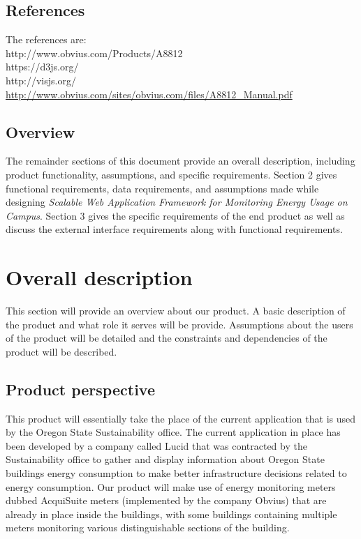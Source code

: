 \documentclass[onecolumn, draftclsnofoot,10pt, compsoc]{IEEEtran}
\begin{document}
    \subsection{References} 
	The references are:\\
	http://www.obvius.com/Products/A8812 \\
    https://d3js.org/  \\
    http://visjs.org/  \\
    \url{http://www.obvius.com/sites/obvius.com/files/A8812_Manual.pdf}

    \subsection{Overview}
	The remainder sections of this document provide an overall description, including product functionality, assumptions, and specific requirements. Section 2 gives functional requirements, data requirements, and assumptions made while designing \textit{Scalable Web Application Framework for Monitoring Energy Usage on Campus}. Section 3 gives the specific requirements of the end product as well as discuss the external interface requirements along with functional requirements.
	
    \section{Overall description}
    This section will provide an overview about our product. A basic description of the product and what role it serves will be provide. Assumptions about the users of the product will be detailed and the constraints and dependencies of the product will be described. 
    \subsection{Product perspective}
    This product will essentially take the place of the current application that is used by the Oregon State Sustainability office. The current application in place has been developed by a company called Lucid that was contracted by the Sustainability office to gather and display information about Oregon State buildings energy consumption to make better infrastructure decisions related to energy consumption. Our product will make use of energy monitoring meters dubbed AcquiSuite meters (implemented by the company Obvius) that are already in place inside the buildings, with some buildings containing multiple meters monitoring various distinguishable sections of the building.
    
\end{document}
